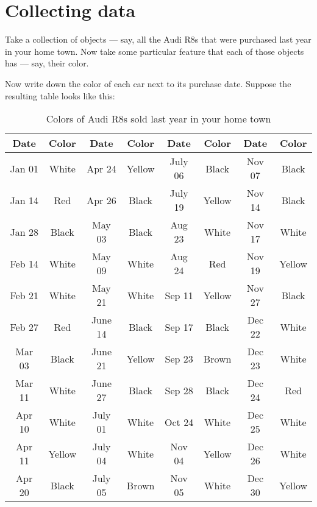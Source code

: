 \section{Collecting data}

Take a collection of objects --- say, all the Audi R8s that were purchased last year in your home town. Now take some particular feature that each of those objects has --- say, their color. 

Now write down the color of each car next to its purchase date. Suppose the resulting table looks like this:

\begin{table}[!htbp]
  \begin{tabular}{| c | c || c | c || c | c || c | c |}
    \hline
    \textbf{Date} & \textbf{Color} & \textbf{Date} & \textbf{Color} & \textbf{Date} & \textbf{Color} & \textbf{Date} & \textbf{Color} \\ \hline
    Jan 01 & White & Apr 24 & Yellow & July 06 & Black & Nov 07 & Black \\ \hline
    Jan 14 & Red & Apr 26 & Black & July 19 & Yellow & Nov 14 & Black \\ \hline
    Jan 28 & Black & May 03 & Black & Aug 23 & White & Nov 17 & White \\ \hline
    Feb 14 & White & May 09 & White & Aug 24 & Red & Nov 19 & Yellow \\ \hline
    Feb 21 & White & May 21 & White & Sep 11 & Yellow & Nov 27 & Black \\ \hline
    Feb 27 & Red & June 14 & Black & Sep 17 & Black & Dec 22 & White \\ \hline
    Mar 03 & Black & June 21 & Yellow & Sep 23 & Brown & Dec 23 & White \\ \hline
    Mar 11 & White & June 27 & Black & Sep 28 & Black & Dec 24 & Red \\ \hline
    Apr 10 & White & July 01 & White & Oct 24 & White & Dec 25 & White \\ \hline
    Apr 11 & Yellow & July 04 & White & Nov 04 & Yellow & Dec 26 & White \\ \hline
    Apr 20 & Black & July 05 & Brown & Nov 05 & White & Dec 30 & Yellow \\ \hline
  \end{tabular}
  \caption{\label{table:R8 raw data} Colors of Audi R8s sold last year in your home town}
\end{table}

